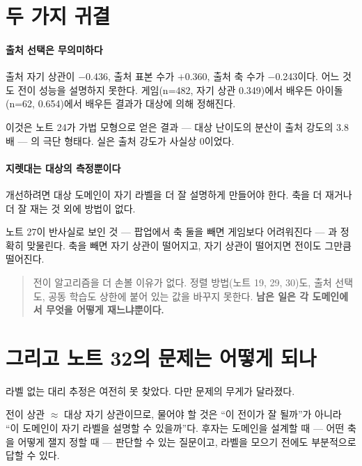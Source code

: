 \documentclass[10pt]{article}
\begin{document}
\section{두 가지 귀결}

\paragraph{출처 선택은 무의미하다}
출처 자기 상관이 $-$0.436, 출처 표본 수가 $+$0.360, 출처 축 수가 $-$0.243이다.
어느 것도 전이 성능을 설명하지 못한다. 게임(n=482, 자기 상관 0.349)에서 배우든
아이돌(n=62, 0.654)에서 배우든 결과가 대상에 의해 정해진다.

이것은 노트 24가 가법 모형으로 얻은 결과 --- 대상 난이도의 분산이 출처 강도의
3.8배 --- 의 극단 형태다. 실은 출처 강도가 사실상 0이었다.

\paragraph{지렛대는 대상의 측정뿐이다}
개선하려면 대상 도메인이 자기 라벨을 더 잘 설명하게 만들어야 한다. 축을 더 재거나
더 잘 재는 것 외에 방법이 없다.

노트 27이 반사실로 보인 것 --- 팝업에서 축 둘을 빼면 게임보다 어려워진다 ---
과 정확히 맞물린다. 축을 빼면 자기 상관이 떨어지고, 자기 상관이 떨어지면 전이도
그만큼 떨어진다.

\begin{quote}\fontsize{9.5}{11.5}\selectfont
전이 알고리즘을 더 손볼 이유가 없다. 정렬 방법(노트 19, 29, 30)도, 출처 선택도,
공동 학습도 상한에 붙어 있는 값을 바꾸지 못한다. \textbf{남은 일은 각 도메인에서
무엇을 어떻게 재느냐뿐이다.}
\end{quote}

\section{그리고 노트 32의 문제는 어떻게 되나}

라벨 없는 대리 추정은 여전히 못 찾았다. 다만 문제의 무게가 달라졌다.

전이 상관 $\approx$ 대상 자기 상관이므로, 물어야 할 것은 ``이 전이가 잘 될까''가
아니라 ``이 도메인이 자기 라벨을 설명할 수 있을까''다. 후자는 도메인을 설계할 때
--- 어떤 축을 어떻게 잴지 정할 때 --- 판단할 수 있는 질문이고, 라벨을 모으기
전에도 부분적으로 답할 수 있다.

\end{document}
